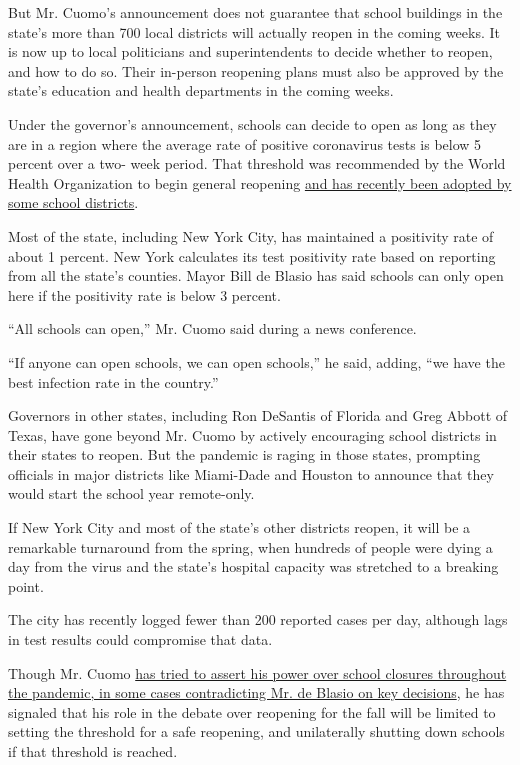 But Mr. Cuomo's announcement does not guarantee that school buildings in
the state's more than 700 local districts will actually reopen in the
coming weeks. It is now up to local politicians and superintendents to
decide whether to reopen, and how to do so. Their in-person reopening
plans must also be approved by the state's education and health
departments in the coming weeks.

Under the governor's announcement, schools can decide to open as long as
they are in a region where the average rate of positive coronavirus
tests is below 5 percent over a two- week period. That threshold was
recommended by the World Health Organization to begin general reopening
\href{https://www.nytimes.com/2020/07/14/us/coronavirus-schools-fall.html}{and
has recently been adopted by some school districts}.

Most of the state, including New York City, has maintained a positivity
rate of about 1 percent. New York calculates its test positivity rate
based on reporting from all the state's counties. Mayor Bill de Blasio
has said schools can only open here if the positivity rate is below 3
percent.

``All schools can open,'' Mr. Cuomo said during a news conference.

``If anyone can open schools, we can open schools,'' he said, adding,
``we have the best infection rate in the country.''

Governors in other states, including Ron DeSantis of Florida and Greg
Abbott of Texas, have gone beyond Mr. Cuomo by actively encouraging
school districts in their states to reopen. But the pandemic is raging
in those states, prompting officials in major districts like Miami-Dade
and Houston to announce that they would start the school year
remote-only.

If New York City and most of the state's other districts reopen, it will
be a remarkable turnaround from the spring, when hundreds of people were
dying a day from the virus and the state's hospital capacity was
stretched to a breaking point.

The city has recently logged fewer than 200 reported cases per day,
although lags in test results could compromise that data.

Though Mr. Cuomo
\href{https://www.nytimes.com/2020/04/12/nyregion/schools-cuomo-de-blasio-nyc-coronavirus.html}{has
tried to assert his power over school closures throughout the pandemic,
in some cases contradicting Mr. de Blasio on key decisions}, he has
signaled that his role in the debate over reopening for the fall will be
limited to setting the threshold for a safe reopening, and unilaterally
shutting down schools if that threshold is reached.

